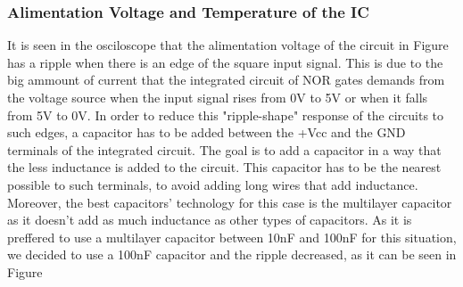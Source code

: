 \documentclass[a4paper,11pt]{report}
\begin{document}
\subsubsection{\color{red}Alimentation Voltage and Temperature of the IC}

It is seen in the osciloscope that the alimentation voltage of the circuit in Figure %
has a ripple when there is an edge of the square input signal. This is due to the big ammount of current that the integrated circuit of NOR gates demands from the voltage source when the input signal rises from 0V to 5V or when it falls from 5V to 0V. 
In order to reduce this "ripple-shape" response of the circuits to such edges, a capacitor has to be added between the +Vcc and the GND terminals of the integrated circuit. The goal is to add a capacitor in a way that the less inductance is added to the circuit. This capacitor has to be the nearest possible to such terminals, to avoid adding long wires that add inductance. Moreover,  the best capacitors' technology for this case is the multilayer capacitor as it doesn't add as much inductance as other types of capacitors. As it is preffered to use a multilayer capacitor between 10nF and 100nF for this situation, we decided to use a 100nF capacitor and the ripple decreased, as it can be seen in Figure %
\end{document}
